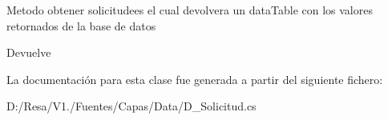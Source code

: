 Metodo obtener solicitudees el cual devolvera un data\+Table con los valores retornados de la base de datos 

\begin{DoxyReturn}{Devuelve}

\end{DoxyReturn}


La documentación para esta clase fue generada a partir del siguiente fichero\+:\begin{DoxyCompactItemize}
\item 
D\+:/\+Resa/\+V1./\+Fuentes/\+Capas/\+Data/D\+\_\+\+Solicitud.\+cs\end{DoxyCompactItemize}
